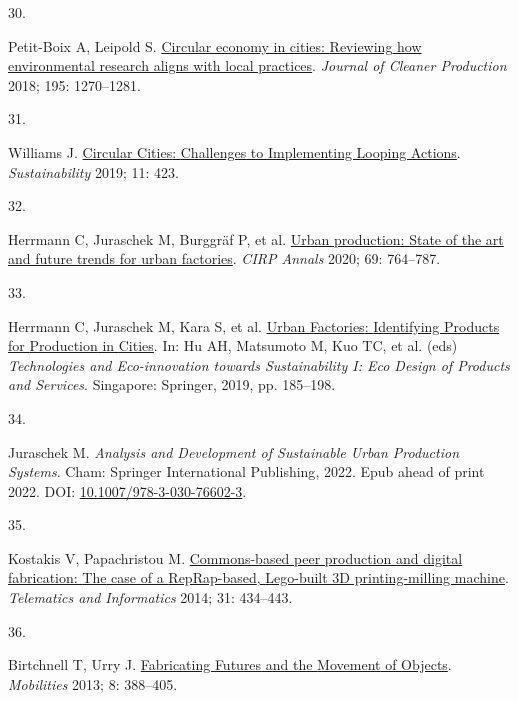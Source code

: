 \documentclass[
  12pt,
  a4paperpaper,
  onecolumn]{article}
\newlength{\cslhangindent}
\newlength{\csllabelwidth}
\newlength{\cslentryspacingunit} %
\newenvironment{CSLReferences}[2] %
 {%
  \setlength{\parindent}{0pt}
  \ifodd #1
  \let\oldpar\par
  \def\par{\hangindent=\cslhangindent\oldpar}
  \fi
  \setlength{\parskip}{#2\cslentryspacingunit}
 }%
 {}
\newcommand{\CSLLeftMargin}[1]{\parbox[t]{\csllabelwidth}{#1}}
\newcommand{\CSLRightInline}[1]{\parbox[t]{\linewidth - \csllabelwidth}{#1}\break}
\begin{document}
\begin{CSLReferences}{0}{0}
\leavevmode{}%
\CSLLeftMargin{30. }%
\CSLRightInline{Petit-Boix A, Leipold S.
\href{https://doi.org/10.1016/j.jclepro.2018.05.281}{Circular economy in
cities: {Reviewing} how environmental research aligns with local
practices}. \emph{Journal of Cleaner Production} 2018; 195: 1270--1281.}

\leavevmode{}%
\CSLLeftMargin{31. }%
\CSLRightInline{Williams J.
\href{https://doi.org/10.3390/su11020423}{Circular {Cities}:
{Challenges} to {Implementing Looping Actions}}. \emph{Sustainability}
2019; 11: 423.}

\leavevmode{}%
\CSLLeftMargin{32. }%
\CSLRightInline{Herrmann C, Juraschek M, Burggräf P, et al.
\href{https://doi.org/10.1016/j.cirp.2020.05.003}{Urban production:
{State} of the art and future trends for urban factories}. \emph{CIRP
Annals} 2020; 69: 764--787.}

\leavevmode{}%
\CSLLeftMargin{33. }%
\CSLRightInline{Herrmann C, Juraschek M, Kara S, et al.
\href{https://doi.org/10.1007/978-981-13-1181-9_15}{Urban {Factories}:
{Identifying Products} for {Production} in {Cities}}. In: Hu AH,
Matsumoto M, Kuo TC, et al. (eds) \emph{Technologies and
{Eco-innovation} towards {Sustainability I}: {Eco Design} of {Products}
and {Services}}. {Singapore}: {Springer}, 2019, pp. 185--198.}

\leavevmode{}%
\CSLLeftMargin{34. }%
\CSLRightInline{Juraschek M. \emph{Analysis and {Development} of
{Sustainable Urban Production Systems}}. {Cham}: {Springer International
Publishing}, 2022. Epub ahead of print 2022. DOI:
\href{https://doi.org/10.1007/978-3-030-76602-3}{10.1007/978-3-030-76602-3}.}

\leavevmode{}%
\CSLLeftMargin{35. }%
\CSLRightInline{Kostakis V, Papachristou M.
\href{https://doi.org/10.1016/j.tele.2013.09.006}{Commons-based peer
production and digital fabrication: {The} case of a {RepRap-based},
{Lego-built 3D} printing-milling machine}. \emph{Telematics and
Informatics} 2014; 31: 434--443.}

\leavevmode{}%
\CSLLeftMargin{36. }%
\CSLRightInline{Birtchnell T, Urry J.
\href{https://doi.org/10.1080/17450101.2012.745697}{Fabricating
{Futures} and the {Movement} of {Objects}}. \emph{Mobilities} 2013; 8:
388--405.}


\end{CSLReferences}
\end{document}
